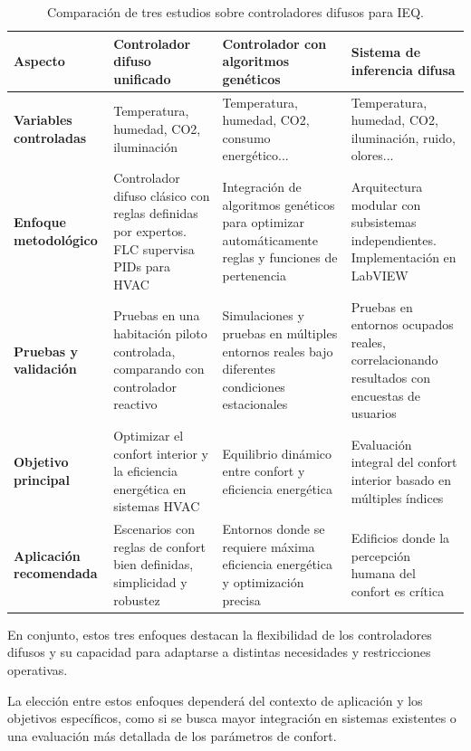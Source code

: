 \begin{table}[H]
	\centering
	\renewcommand{\arraystretch}{1.5}
	\begin{tabular}{|p{2.5cm}|p{4cm}|p{4cm}|p{4cm}|}
		\hline
		\rowcolor{lightgray}
		\textbf{Aspecto} & \textbf{Controlador difuso unificado} & \textbf{Controlador con algoritmos genéticos} & \textbf{Sistema de inferencia difusa} \\ \hline
		
		\textbf{Variables controladas} & 
		Temperatura, humedad, CO2, iluminación & 
		Temperatura, humedad, CO2, consumo energético... & 
		Temperatura, humedad, CO2, iluminación, ruido, olores... \\ \hline
		
		\textbf{Enfoque metodológico} & 
		Controlador difuso clásico con reglas definidas por expertos. FLC supervisa PIDs para HVAC & 
		Integración de algoritmos genéticos para optimizar automáticamente reglas y funciones de pertenencia & 
		Arquitectura modular con subsistemas independientes. Implementación en LabVIEW \\ \hline
		
		\textbf{Pruebas y validación} & 
		Pruebas en una habitación piloto controlada, comparando con controlador reactivo & 
		Simulaciones y pruebas en múltiples entornos reales bajo diferentes condiciones estacionales & 
		Pruebas en entornos ocupados reales, correlacionando resultados con encuestas de usuarios \\ \hline
		
		\textbf{Objetivo principal} & 
		Optimizar el confort interior y la eficiencia energética en sistemas HVAC & 
		Equilibrio dinámico entre confort y eficiencia energética & 
		Evaluación integral del confort interior basado en múltiples índices \\ \hline
		
		\textbf{Aplicación recomendada} & 
		Escenarios con reglas de confort bien definidas, simplicidad y robustez & 
		Entornos donde se requiere máxima eficiencia energética y optimización precisa & 
		Edificios donde la percepción humana del confort es crítica \\ \hline
	\end{tabular}
	\caption{Comparación de tres estudios sobre controladores difusos para IEQ.}
	\label{tab:comparacion}
\end{table}

En conjunto, estos tres enfoques destacan la flexibilidad de los controladores difusos y su capacidad para adaptarse a distintas necesidades y restricciones operativas.

La elección entre estos enfoques dependerá del contexto de aplicación y los objetivos específicos, como si se busca mayor integración en sistemas existentes o una evaluación más detallada de los parámetros de confort.